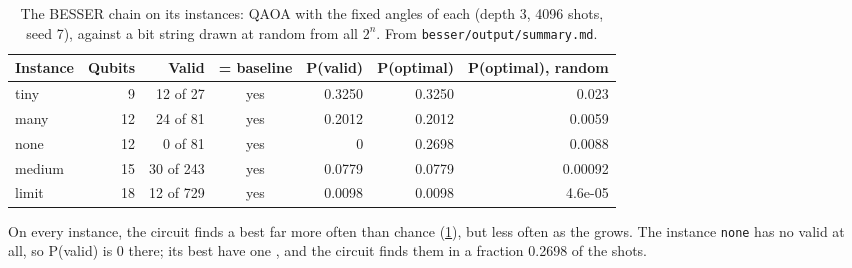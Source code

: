 \begin{table}
	\caption{The BESSER chain on its instances: QAOA with the fixed angles of each  (depth 3, 4096 shots, seed 7), against a bit string drawn at random from all $2^n$. From \texttt{besser/output/summary.md}.}\label{tab:validation-besser}
	\footnotesize
	\begin{tabular}{@{}lrrcrrr@{}}
		\toprule
		Instance & Qubits & Valid \term{schedules} & \term{QUBO} = baseline & P(valid) & P(optimal) & P(optimal), random \\
		\midrule
		tiny     & 9      & 12 of 27        & yes             & 0.3250   & 0.3250     & 0.023              \\
		many     & 12     & 24 of 81        & yes             & 0.2012   & 0.2012     & 0.0059             \\
		none     & 12     & 0 of 81         & yes             & 0        & 0.2698     & 0.0088             \\
		medium   & 15     & 30 of 243       & yes             & 0.0779   & 0.0779     & 0.00092            \\
		limit    & 18     & 12 of 729       & yes             & 0.0098   & 0.0098     & 4.6e-05           \\
		\bottomrule
	\end{tabular}
\end{table}

On every instance, the circuit finds a best  far more often than chance (\cref{tab:validation-besser}), but less often as the  grows. The instance \texttt{none} has no valid  at all, so P(valid) is 0 there; its best  have one , and the circuit finds them in a fraction 0.2698 of the shots.

